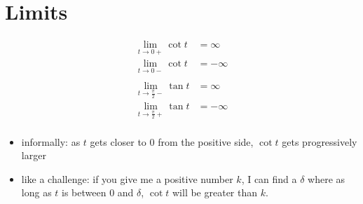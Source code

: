 \documentclass{exam}
\begin{document}
  \section{Limits}
  \begin{align*}
    \lim_{t \to 0+} \cot t & = \infty \\
    \lim_{t \to 0-} \cot t & = -\infty \\
    \\
    \lim_{t \to \frac{\pi}{2}-} \tan t & = \infty \\
    \lim_{t \to \frac{\pi}{2}+} \tan t & = -\infty \\
  \end{align*}

  \begin{itemize}
    \item informally: as $t$ gets closer to 0 from the positive side, $\cot t$ gets progressively larger
    \item like a challenge: if you give me a positive number $k$, I can find a $\delta$ where as long as $t$ is between 0 and
      $\delta$, $\cot t$ will be greater than $k$.
  \end{itemize}
\end{document}
